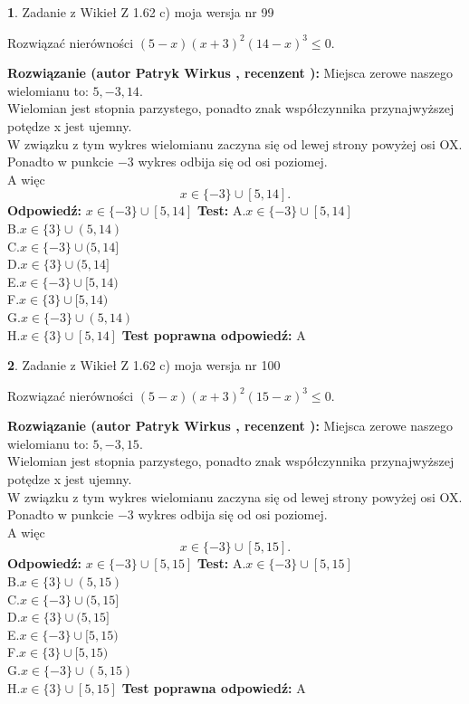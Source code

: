 \documentclass[12pt, a4paper]{article}
\theoremstyle{definition} %
\newtheorem{zad}{}
\newcommand{\zadStart}[1]{\begin{zad}#1\newline}
\newcommand{\zadStop}{\end{zad}}
\newcommand{\rozwStart}[2]{\noindent \textbf{Rozwiązanie (autor #1 , recenzent #2): }\newline}
\newcommand{\rozwStop}{\newline}
\newcommand{\odpStart}{\noindent \textbf{Odpowiedź:}\newline}
\newcommand{\odpStop}{\newline}
\newcommand{\testStart}{\noindent \textbf{Test:}\newline}
\newcommand{\testStop}{\newline}
\newcommand{\kluczStart}{\noindent \textbf{Test poprawna odpowiedź:}\newline}
\newcommand{\kluczStop}{\newline}
\begin{document}
\zadStart{Zadanie z Wikieł Z 1.62 c) moja wersja nr 99}

Rozwiązać nierówności $(5-x)(x+3)^{2}(14-x)^{3}\le0$.
\zadStop
\rozwStart{Patryk Wirkus}{}
Miejsca zerowe naszego wielomianu to: $5, -3, 14$.\\
Wielomian jest stopnia parzystego, ponadto znak współczynnika przy\linebreak najwyższej potędze x jest ujemny.\\ W związku z tym wykres wielomianu zaczyna się od lewej strony powyżej osi OX.\\
Ponadto w punkcie $-3$ wykres odbija się od osi poziomej.\\
A więc $$x \in \{-3\} \cup [5,14].$$
\rozwStop
\odpStart
$x \in \{-3\} \cup [5,14]$
\odpStop
\testStart
A.$x \in \{-3\} \cup [5,14]$\\
B.$x \in \{3\} \cup (5,14)$\\
C.$x \in \{-3\} \cup (5,14]$\\
D.$x \in \{3\} \cup (5,14]$\\
E.$x \in \{-3\} \cup [5,14)$\\
F.$x \in \{3\} \cup [5,14)$\\
G.$x \in \{-3\} \cup (5,14)$\\
H.$x \in \{3\} \cup [5,14]$
\testStop
\kluczStart
A
\kluczStop



\zadStart{Zadanie z Wikieł Z 1.62 c) moja wersja nr 100}

Rozwiązać nierówności $(5-x)(x+3)^{2}(15-x)^{3}\le0$.
\zadStop
\rozwStart{Patryk Wirkus}{}
Miejsca zerowe naszego wielomianu to: $5, -3, 15$.\\
Wielomian jest stopnia parzystego, ponadto znak współczynnika przy\linebreak najwyższej potędze x jest ujemny.\\ W związku z tym wykres wielomianu zaczyna się od lewej strony powyżej osi OX.\\
Ponadto w punkcie $-3$ wykres odbija się od osi poziomej.\\
A więc $$x \in \{-3\} \cup [5,15].$$
\rozwStop
\odpStart
$x \in \{-3\} \cup [5,15]$
\odpStop
\testStart
A.$x \in \{-3\} \cup [5,15]$\\
B.$x \in \{3\} \cup (5,15)$\\
C.$x \in \{-3\} \cup (5,15]$\\
D.$x \in \{3\} \cup (5,15]$\\
E.$x \in \{-3\} \cup [5,15)$\\
F.$x \in \{3\} \cup [5,15)$\\
G.$x \in \{-3\} \cup (5,15)$\\
H.$x \in \{3\} \cup [5,15]$
\testStop
\kluczStart
A
\kluczStop
\end{document}
